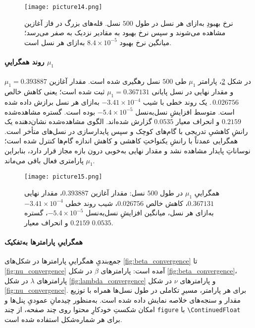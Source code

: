 \begin{figure}[htbp]
  \centering
  \texttt{[image: picture14.png]}%
  \caption{نرخ بهبودِ به‌ازای هر نسل در طول \(500\) نسل. قله‌های بزرگ در فاز آغازین مشاهده می‌شوند و سپس نرخ بهبود به مقادیر نزدیک به صفر می‌رسد؛ میانگین نرخ بهبود \(8.4\times 10^{-5}\) به‌ازای هر نسل است.}
  \label{fig:improvement_rate}
\end{figure}

\paragraph{روند همگراییِ \(\mu_1\)}
در شکل \ref{fig:mu1_convergence}، پارامتر \(\mu_1\) طی \(500\) نسل رهگیری شده است. مقدار آغازین \(\mu_1=0.393887\) و مقدار نهایی در نسل پایانی \(\mu_1=0.367131\) ثبت شده است؛ یعنی کاهش خالص \(\,0.026756\). یک روند خطی با شیب \(-3.41\times 10^{-4}\) به‌ازای هر نسل برازش داده شده است. متوسط افزایشِ نسل‌به‌نسل \(-5.4\times 10^{-5}\) بوده است. گستره مشاهده‌شده \(0.2159\) و انحراف معیار \(0.0535\) گزارش شده‌اند. الگوی مشاهده‌شده نشان‌دهنده یک رانشِ کاهشیِ تدریجی با گام‌های کوچک و سپس پایدارسازی در نسل‌های متأخر است. همگرایی عمدتاً با رانشِ یکنواختِ کاهشی و کاهش اندازه گام‌ها کنترل شده است؛ نوساناتِ پایدار مشاهده نشد و مقدار نهایی به‌خوبی درون بازه مجاز قرار دارد، بنابراین \(\mu_1\) پارامتری فعال باقی می‌ماند.

\begin{figure}[htbp]
  \centering
  \texttt{[image: picture15.png]}%
  \caption{همگراییِ \(\mu_1\) در طول \(500\) نسل: مقدار آغازین \(0.393887\)، مقدار نهایی \(0.367131\)، کاهش خالص \(0.026756\)، شیب روند خطی \(-3.41\times 10^{-4}\) به‌ازای هر نسل، میانگین افزایشِ نسل‌به‌نسل \(-5.4\times 10^{-5}\)، گستره \(0.2159\) و انحراف معیار \(0.0535\).}
  \label{fig:mu1_convergence}
\end{figure}

\paragraph{همگراییِ پارامترها به‌تفکیک}
جمع‌بندیِ همگراییِ پارامترها در شکل‌های \ref{fig:beta_convergence} تا \ref{fig:nu_convergence} آمده است: پارامترهای \(\beta\) در شکل \ref{fig:beta_convergence}، پارامترهای \(\lambda\) در شکل \ref{fig:lambda_convergence} و پارامترهای \(\nu\) در شکل \ref{fig:nu_convergence}. برای هر پارامتر، مسیرِ تکاملی در طول نسل‌ها همراه با توزیع مقدار و سنجه‌های خلاصه نمایش داده شده است. به‌منظور چیدمانِ عمودیِ پنل‌ها و امکان شکستِ خودکارِ محتوا روی چند صفحه، از چند \texttt{figure} با \texttt{\textbackslash ContinuedFloat} برای هر شماره‌شکل استفاده شده است.


